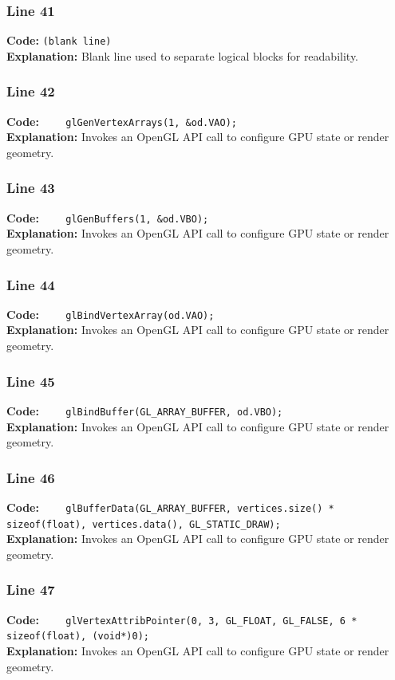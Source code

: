 \documentclass[11pt,a4paper]{article}
\begin{document}
\subsubsection*{Line 41}
\textbf{Code:} \texttt{(blank line)}\\
\textbf{Explanation:} Blank line used to separate logical blocks for readability.

\subsubsection*{Line 42}
\textbf{Code:} \verb|    glGenVertexArrays(1, &od.VAO);|\\
\textbf{Explanation:} Invokes an OpenGL API call to configure GPU state or render geometry.

\subsubsection*{Line 43}
\textbf{Code:} \verb|    glGenBuffers(1, &od.VBO);|\\
\textbf{Explanation:} Invokes an OpenGL API call to configure GPU state or render geometry.

\subsubsection*{Line 44}
\textbf{Code:} \verb|    glBindVertexArray(od.VAO);|\\
\textbf{Explanation:} Invokes an OpenGL API call to configure GPU state or render geometry.

\subsubsection*{Line 45}
\textbf{Code:} \verb|    glBindBuffer(GL_ARRAY_BUFFER, od.VBO);|\\
\textbf{Explanation:} Invokes an OpenGL API call to configure GPU state or render geometry.

\subsubsection*{Line 46}
\textbf{Code:} \verb|    glBufferData(GL_ARRAY_BUFFER, vertices.size() * sizeof(float), vertices.data(), GL_STATIC_DRAW);|\\
\textbf{Explanation:} Invokes an OpenGL API call to configure GPU state or render geometry.

\subsubsection*{Line 47}
\textbf{Code:} \verb|    glVertexAttribPointer(0, 3, GL_FLOAT, GL_FALSE, 6 * sizeof(float), (void*)0);|\\
\textbf{Explanation:} Invokes an OpenGL API call to configure GPU state or render geometry.
\end{document}
